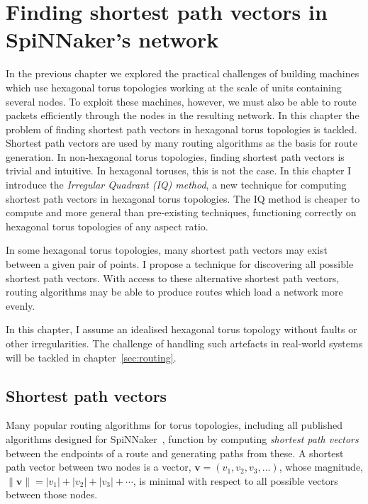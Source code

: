 \chapter{Finding shortest path vectors in SpiNNaker's network}
	
	\label{sec:shortestPaths}
	
	
	In the previous chapter we explored the practical challenges of building
	machines which use hexagonal torus topologies working at the scale of units
	containing several nodes. To exploit these machines, however, we must also be
	able to route packets efficiently through the nodes in the resulting network.
	In this chapter the problem of finding shortest path vectors in hexagonal
	torus topologies is tackled. Shortest path vectors are used by many routing
	algorithms as the basis for route generation. In non-hexagonal torus
	topologies, finding shortest path vectors is trivial and intuitive. In
	hexagonal toruses, this is not the case.  In this chapter I introduce the
	\emph{Irregular Quadrant (IQ) method}, a new technique for computing shortest
	path vectors in hexagonal torus topologies.  The IQ method is cheaper to
	compute and more general than pre-existing techniques, functioning correctly
	on hexagonal torus topologies of any aspect ratio.
	
	In some hexagonal torus topologies, many shortest path vectors may exist
	between a given pair of points. I propose a technique for discovering all
	possible shortest path vectors. With access to these alternative shortest
	path vectors, routing algorithms may be able to produce routes which load a
	network more evenly.
	
	In this chapter, I assume an idealised hexagonal torus topology without
	faults or other irregularities. The challenge of handling such artefacts in
	real-world systems will be tackled in chapter~\ref{sec:routing}.
	
	\section{Shortest path vectors}
		
		Many popular routing algorithms for torus topologies, including all
		published algorithms designed for SpiNNaker~\cite{davies12,navaridas14},
		function by computing \emph{shortest path vectors} between the endpoints of
		a route and generating paths from these. A shortest path vector between two
		nodes is a vector, $\mathbf{v} = (v_1, v_2, v_3, \ldots)$, whose magnitude,
		$\| \mathbf{v} \| = \lvert v_1 \rvert + \lvert v_2 \rvert + \lvert v_3
		\rvert + \cdots$, is minimal with respect to all possible vectors between
		those nodes.
		
